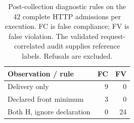 \begin{table}[t]\centering\small
\caption{Post-collection diagnostic rules on the 42 complete HTTP admissions per execution. FC is false compliance; FV is false violation. The validated request-correlated audit supplies reference labels. Refusals are excluded.}
\label{tab:observation}
\begin{tabular}{@{}lrr@{}}\toprule
Observation / rule & FC & FV \\ \midrule
Delivery only & 9 & 0 \\
Declared front minimum & 3 & 0 \\
Both H, ignore declaration & 0 & 24 \\
\bottomrule\end{tabular}
\end{table}
